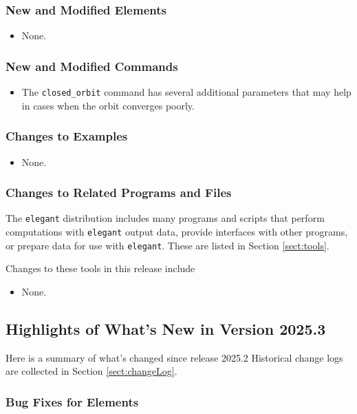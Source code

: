 \documentclass[11pt]{article}
\begin{document}
\subsubsection{New and Modified Elements}
\begin{itemize}
\item None.
\end{itemize}

\subsubsection{New and Modified Commands}
\begin{itemize}
\item The \verb|closed_orbit| command has several additional parameters that may help in cases when the orbit converges
  poorly.
\end{itemize}

\subsubsection{Changes to Examples}

\begin{itemize}
\item None.
\end{itemize}

\subsubsection{Changes to Related Programs and Files}

The {\tt elegant} distribution includes many programs and scripts that perform computations with {\tt elegant}
output data, provide interfaces with other programs, or prepare data for use with {\tt elegant}. These
are listed in Section \ref{sect:tools}. 

Changes to these tools in this release include
\begin{itemize}
\item None.
\end{itemize}

\subsection{Highlights of What's New in Version 2025.3}

Here is a summary of what's changed since release 2025.2  Historical change logs are collected in Section
\ref{sect:changeLog}.

\subsubsection{Bug Fixes for Elements}
\end{document}
